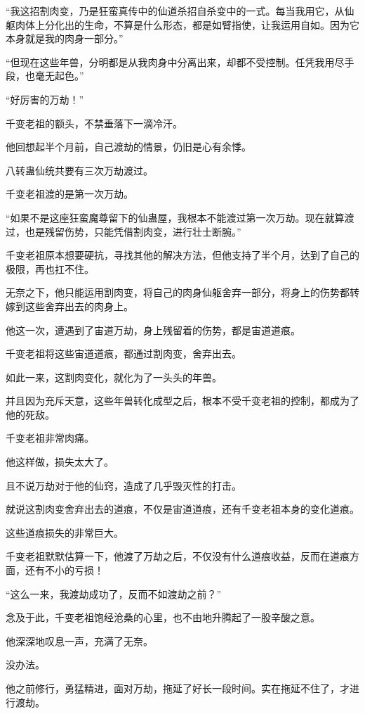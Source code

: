 \begin{this_body}
“我这招割肉变，乃是狂蛮真传中的仙道杀招自杀变中的一式。每当我用它，从仙躯肉体上分化出的生命，不算是什么形态，都是如臂指使，让我运用自如。因为它本身就是我的肉身一部分。”

“但现在这些年兽，分明都是从我肉身中分离出来，却都不受控制。任凭我用尽手段，也毫无起色。”

“好厉害的万劫！”

千变老祖的额头，不禁垂落下一滴冷汗。

他回想起半个月前，自己渡劫的情景，仍旧是心有余悸。

八转蛊仙统共要有三次万劫渡过。

千变老祖渡的是第一次万劫。

“如果不是这座狂蛮魔尊留下的仙蛊屋，我根本不能渡过第一次万劫。现在就算渡过，也是残留伤势，只能凭借割肉变，进行壮士断腕。”

千变老祖原本想要硬抗，寻找其他的解决方法，但他支持了半个月，达到了自己的极限，再也扛不住。

无奈之下，他只能运用割肉变，将自己的肉身仙躯舍弃一部分，将身上的伤势都转嫁到这些舍弃出去的肉身上。

他这一次，遭遇到了宙道万劫，身上残留着的伤势，都是宙道道痕。

千变老祖将这些宙道道痕，都通过割肉变，舍弃出去。

如此一来，这割肉变化，就化为了一头头的年兽。

并且因为充斥天意，这些年兽转化成型之后，根本不受千变老祖的控制，都成为了他的死敌。

千变老祖非常肉痛。

他这样做，损失太大了。

且不说万劫对于他的仙窍，造成了几乎毁灭性的打击。

就说这割肉变舍弃出去的道痕，不仅是宙道道痕，还有千变老祖本身的变化道痕。

这些道痕损失的非常巨大。

千变老祖默默估算一下，他渡了万劫之后，不仅没有什么道痕收益，反而在道痕方面，还有不小的亏损！

“这么一来，我渡劫成功了，反而不如渡劫之前？”

念及于此，千变老祖饱经沧桑的心里，也不由地升腾起了一股辛酸之意。

他深深地叹息一声，充满了无奈。

没办法。

他之前修行，勇猛精进，面对万劫，拖延了好长一段时间。实在拖延不住了，才进行渡劫。


\end{this_body}
